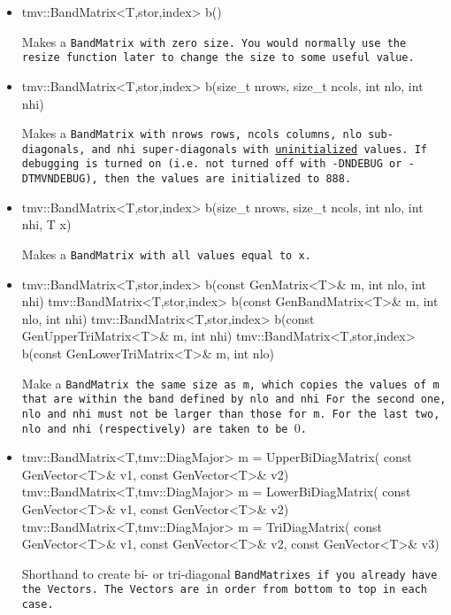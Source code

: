 \begin{itemize}

\item
\begin{tmvcode}
tmv::BandMatrix<T,stor,index> b()
\end{tmvcode}
Makes a \tt{BandMatrix} with zero size.  You would normally use the \tt{resize} function later to
change the size to some useful value.

\item 
\begin{tmvcode}
tmv::BandMatrix<T,stor,index> b(size_t nrows, size_t ncols, 
      int nlo, int nhi)
\end{tmvcode}
Makes a \tt{BandMatrix} with \tt{nrows} rows, \tt{ncols} columns, 
\tt{nlo} sub-diagonals,
and \tt{nhi} super-diagonals with \underline{uninitialized} values.
If debugging is turned on (i.e. not turned off 
with \tt{-DNDEBUG} or \tt{-DTMVNDEBUG}), then the values are initialized to 888.

\item
\begin{tmvcode}
tmv::BandMatrix<T,stor,index> b(size_t nrows, size_t ncols, 
      int nlo, int nhi, T x)
\end{tmvcode}
Makes a \tt{BandMatrix} with all values equal to \tt{x}.

\item 
\begin{tmvcode}
tmv::BandMatrix<T,stor,index> b(const GenMatrix<T>& m, 
      int nlo, int nhi)
tmv::BandMatrix<T,stor,index> b(const GenBandMatrix<T>& m, 
      int nlo, int nhi)
tmv::BandMatrix<T,stor,index> b(const GenUpperTriMatrix<T>& m,
      int nhi)
tmv::BandMatrix<T,stor,index> b(const GenLowerTriMatrix<T>& m,
      int nlo)
\end{tmvcode}
Make a \tt{BandMatrix} the same size as \tt{m}, which copies the values of \tt{m}
that are within the band defined by \tt{nlo} and \tt{nhi}
For the second one, \tt{nlo} and \tt{nhi} must not be larger than those for \tt{m}.
For the last two, \tt{nlo} and \tt{nhi} (respectively) are taken to be $0$.

\item
\begin{tmvcode}
tmv::BandMatrix<T,tmv::DiagMajor> m = UpperBiDiagMatrix(
      const GenVector<T>& v1, const GenVector<T>& v2)
tmv::BandMatrix<T,tmv::DiagMajor> m = LowerBiDiagMatrix(
      const GenVector<T>& v1, const GenVector<T>& v2)
tmv::BandMatrix<T,tmv::DiagMajor> m = TriDiagMatrix(
      const GenVector<T>& v1,  const GenVector<T>& v2, 
      const GenVector<T>& v3)
\end{tmvcode}
Shorthand to create bi- or tri-diagonal \tt{BandMatrix}es if you already have the 
\tt{Vector}s.  The \tt{Vector}s are in order from bottom to top in each case.


\end{itemize}
